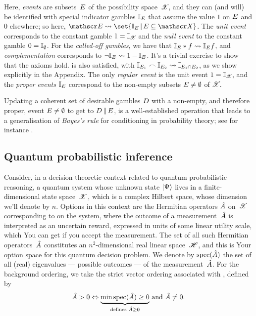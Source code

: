 \documentclass[preprint]{isipta2025}
\begin{document}
Here, \emph{events} are subsets~\(\event\) of the possibility space~\(\states\), and they can (and will) be identified with special indicator gambles \(\indevent\) that assume the value \(1\) on \(\event\) and \(0\) elsewhere; so here, \(\eventopts\instantiateas\set{\indevent\given\event\subseteq\states}\).
The \emph{unit event} corresponds to the constant gamble \(1=\indof{\states}\) and the \emph{null event} to the constant gamble \(0=\indof{\emptyset}\).
For the \emph{called-off gambles}, we have that \(\indevent\ast\gbl\instantiateas\indevent\gbl\), and \emph{complementation} corresponds to \(\neg\indevent\instantiateas1-\indevent\).
It's a trivial exercise to show that the axioms  hold.
 is also satisfied, with \(\indevent[1]\meet\indevent[2]\instantiateas\indof{\event[1]\cap\event[2]}\), as we show explicitly in the Appendix.
The only \emph{regular event} is the unit event \(1=\indof{\states}\), and the \emph{proper events} \(\indevent\) correspond to the non-empty subsets \(\event\neq\emptyset\) of \(\states\).


Updating a coherent set of desirable gambles \(\desirset\) with a non-empty, and therefore proper, event \(\event\neq\emptyset\) to get to \(\desirset\altcondon\event\), is a well-established operation that leads to a generalisation of \emph{Bayes's rule} for conditioning in probability theory; see for instance \cite{walley1991,walley2000,williams1975,troffaes2013:lp}.

\subsection{Quantum probabilistic inference}
Consider, in a decision-theoretic context related to quantum probabilistic reasoning, a quantum system whose unknown state \(\uket\) lives in a finite-dimensional state space~\(\hilbertspace\), which is a complex Hilbert space, whose dimension we'll denote by \(n\).
Options in this context are the Hermitian operators \(\measurement{A}\) on~\(\hilbertspace\) corresponding to  on the system, where the outcome of a measurement~\(\measurement{A}\) is interpreted as an uncertain reward, expressed in units of some linear utility scale, which You can get if you accept the measurement.
The set of all such Hermitian operators~\(\measurement{A}\) constitutes an \(n^2\)-dimensional real linear space~\(\measurements\), and this is Your option space for this quantum decision problem.
We denote by \(\spectrum{A}\) the set of all (real) eigenvalues ---  possible outcomes --- of the measurement~\(\measurement{A}\).
For the background ordering, we take the strict vector ordering associated with , defined by
\begin{equation*}
\measurement{A}\weakgt0
\ifandonlyif\underset{\textrm{defines }\measurement{A}\weakgeq0}{\underbrace{\min\spectrum{A}\geq0}}
\text{ and }\measurement{A}\neq0.
\end{equation*}
\end{document}
